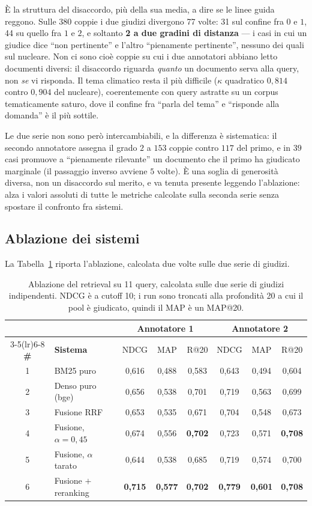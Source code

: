 \documentclass[11pt,a4paper]{report}
\begin{document}
È la struttura del disaccordo, più della sua media, a dire se le linee guida reggono. Sulle 380
coppie i due giudizi divergono 77 volte: 31 sul confine fra $0$ e $1$, 44 su quello fra $1$ e $2$, e
soltanto \textbf{2 a due gradini di distanza} --- i casi in cui un giudice dice ``non pertinente'' e
l'altro ``pienamente pertinente'', nessuno dei quali sul nucleare. Non ci sono cioè coppie su cui i
due annotatori abbiano letto documenti diversi: il disaccordo riguarda \emph{quanto} un documento
serva alla query, non \emph{se} vi risponda. Il tema climatico resta il più difficile ($\kappa$
quadratico $0{,}814$ contro $0{,}904$ del nucleare), coerentemente con query astratte su un corpus
tematicamente saturo, dove il confine fra ``parla del tema'' e ``risponde alla domanda'' è il più
sottile.

Le due serie non sono però intercambiabili, e la differenza è sistematica: il secondo annotatore
assegna il grado $2$ a $153$ coppie contro $117$ del primo, e in $39$ casi promuove a
``pienamente rilevante'' un documento che il primo ha giudicato marginale (il passaggio inverso
avviene $5$ volte). È una soglia di generosità diversa, non un disaccordo sul merito, e va tenuta
presente leggendo l'ablazione: alza i valori assoluti di tutte le metriche calcolate sulla seconda
serie senza spostare il confronto fra sistemi.

\subsection{Ablazione dei sistemi}
La Tabella~\ref{tab:ablazione-retrieval} riporta l'ablazione, calcolata due volte sulle due serie
di giudizi.

\begin{table}[t]
\centering
\small
\begin{tabular}{clcccccc}
\toprule
& & \multicolumn{3}{c}{\textbf{Annotatore 1}} & \multicolumn{3}{c}{\textbf{Annotatore 2}} \\
\cmidrule(lr){3-5}\cmidrule(lr){6-8}
\textbf{\#} & \textbf{Sistema} & NDCG & MAP & R@20 & NDCG & MAP & R@20 \\
\midrule
1 & BM25 puro                  & 0,616 & 0,488 & 0,583 & 0,643 & 0,494 & 0,604 \\
2 & Denso puro (bge)           & 0,656 & 0,538 & 0,701 & 0,719 & 0,563 & 0,699 \\
3 & Fusione RRF                & 0,653 & 0,535 & 0,671 & 0,704 & 0,548 & 0,673 \\
4 & Fusione, $\alpha{=}0{,}45$ & 0,674 & 0,556 & \textbf{0,702} & 0,723 & 0,571 & \textbf{0,708} \\
5 & Fusione, $\alpha$ tarato   & 0,644 & 0,538 & 0,685 & 0,719 & 0,574 & 0,700 \\
6 & Fusione $+$ reranking      & \textbf{0,715} & \textbf{0,577} & \textbf{0,702} & \textbf{0,779} & \textbf{0,601} & \textbf{0,708} \\
\bottomrule
\end{tabular}
\caption{Ablazione del retrieval su 11 query, calcolata sulle due serie di giudizi indipendenti.
NDCG è a cutoff 10; i run sono troncati alla profondità 20 a cui il pool è giudicato, quindi il MAP
è un MAP@20.}
\label{tab:ablazione-retrieval}
\end{table}
\end{document}

